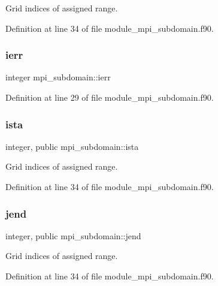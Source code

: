 Grid indices of assigned range. 



Definition at line 34 of file module\+\_\+mpi\+\_\+subdomain.\+f90.

\mbox{\label{namespacempi__subdomain_acd16f258caed20a7d8d38cd28ae64688}} 
\subsubsection{\texorpdfstring{ierr}{ierr}}
{\footnotesize\ttfamily integer mpi\+\_\+subdomain\+::ierr}



Definition at line 29 of file module\+\_\+mpi\+\_\+subdomain.\+f90.

\mbox{\label{namespacempi__subdomain_ab8925faaa6f45326c1d11efa37e03566}} 
\subsubsection{\texorpdfstring{ista}{ista}}
{\footnotesize\ttfamily integer, public mpi\+\_\+subdomain\+::ista}



Grid indices of assigned range. 



Definition at line 34 of file module\+\_\+mpi\+\_\+subdomain.\+f90.

\mbox{\label{namespacempi__subdomain_a06433a0d1a081c51202a0010c21c9d36}} 
\subsubsection{\texorpdfstring{jend}{jend}}
{\footnotesize\ttfamily integer, public mpi\+\_\+subdomain\+::jend}



Grid indices of assigned range. 



Definition at line 34 of file module\+\_\+mpi\+\_\+subdomain.\+f90.

\mbox{\label{namespacempi__subdomain_ac22380b1c941dd6c53cabe7287d185e9}} 
